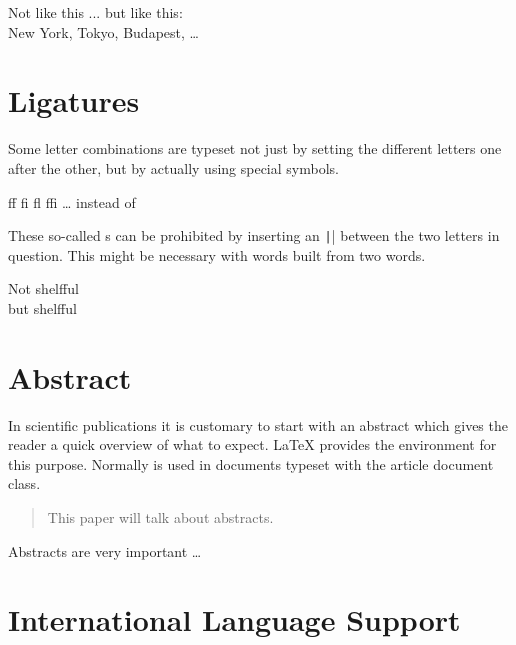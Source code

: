 \begin{chktexignore}
  \begin{example}
Not like this ...
but like this:\\
New York, Tokyo,
Budapest, \ldots
\end{example}
\end{chktexignore}

\section{Ligatures}

Some letter combinations are typeset not just by setting the
different letters one after the other, but by actually using special
symbols.
\begin{code}
{\large ff fi fl ffi \ldots}\quad
instead of
\end{code}
These so-called s can be prohibited by inserting an \texttt|\mbox{}|
between the two letters in question. This might be necessary with
words built from two words.

\begin{example}
\Large %
Not shelfful\\
but shelf\mbox{}ful
\end{example}

\section{Abstract}

In scientific publications it is customary to start with an abstract which
gives the reader a quick overview of what to expect. \LaTeX{} provides the
 environment for this purpose. Normally  is used
in documents typeset with the article document class.

\begin{example}[standalone, paperheight=3.5cm]
\begin{abstract}
  This paper will talk about
  abstracts.
\end{abstract}

Abstracts are very important \ldots
\end{example}

\section{International Language Support}\label{sec:polyglossia}%

